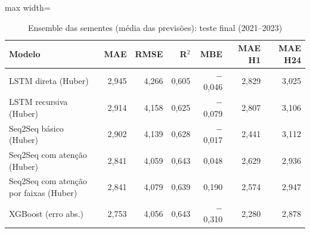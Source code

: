 \begin{table}[!htbp]
    \centering
    \caption{Ensemble das sementes (média das previsões): teste final (2021--2023)}
    \label{tab:ensemble_holdout}
    \small
    \begin{adjustbox}{max width=\textwidth}
    \begin{tabular}{lrrrrrr}
        \toprule
        Modelo & MAE & RMSE & R$^2$ & MBE & MAE H1 & MAE H24 \\
        \midrule
        LSTM direta (Huber) & 2,945 & 4,266 & 0,605 & $-$0,046 & 2,829 & 3,025 \\
        LSTM recursiva (Huber) & 2,914 & 4,158 & 0,625 & $-$0,079 & 2,807 & 3,106 \\
        Seq2Seq básico (Huber) & 2,902 & 4,139 & 0,628 & $-$0,017 & 2,441 & 3,112 \\
        Seq2Seq com atenção (Huber) & 2,841 & 4,059 & 0,643 & 0,048 & 2,629 & 2,936 \\
        Seq2Seq com atenção por faixas (Huber) & 2,841 & 4,079 & 0,639 & 0,190 & 2,574 & 2,947 \\
        XGBoost (erro abs.) & 2,753 & 4,056 & 0,643 & $-$0,310 & 2,280 & 2,878 \\
        \bottomrule
    \end{tabular}
    \end{adjustbox}
\end{table}
